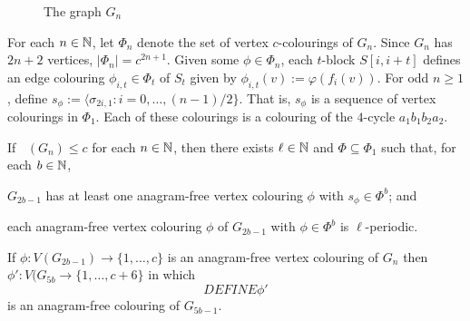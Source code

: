 \documentclass{patmorin}
\DeclareMathOperator{\afcn}{\dot{\chi}_\pi}
\begin{document}
\begin{figure}
    \begin{center}
\end{center}
\caption{The graph $G_n$}
\label{g_n}
\end{figure}

For each $n\in\mathbb{N}$, let $\Phi_n$ denote the set of vertex $c$-colourings of $G_n$. Since $G_n$ has $2n+2$ vertices, $|\Phi_n|=c^{2n+1}$.  Given some $\phi\in\Phi_n$, each $t$-block $S[i,i+t]$ defines an edge colouring $\phi_{i,t}\in \Phi_t$ of $S_t$ given by $\phi_{i,t}(v):=\varphi(f_i(v))$. For odd $n\ge 1$, define $s_\phi:=\langle\sigma_{2i,1}:i=0,\ldots,(n-1)/2\}$.  That is, $s_\phi$ is a sequence of vertex colourings in $\Phi_1$.  Each of these colourings is a colouring of the $4$-cycle $a_1b_1b_2a_2$.

\begin{lem}\label{periodic_vertex_colouring}
    If $\afcn(G_n)\le c$ for each $n\in\mathbb{N}$, then there exists $\ell\in\mathbb{N}$ and $\Phi\subseteq\Phi_1$ such that, for each $b\in\mathbb{N}$,
    \begin{compactenum}
        \item $G_{2b-1}$ has at least one anagram-free vertex colouring $\phi$ with $s_\phi\in\Phi^{b}$; and
        \item each anagram-free vertex colouring $\phi$ of $G_{2b-1}$ with $\phi\in\Phi^{b}$ is $\ell$-periodic.
    \end{compactenum}
\end{lem}


\begin{lem}\label{fixed_breaker_blocks}
    If $\phi:V(G_{2b-1})\to\{1,\ldots,c\}$ is an anagram-free vertex colouring of $G_n$ then $\phi':V(G_{5b}\to\{1,\ldots,c+6\}$ in which
    \[
        DEFINE \phi'
    \]
    is an anagram-free colouring of $G_{5b-1}$.
\end{lem}
\end{document}
